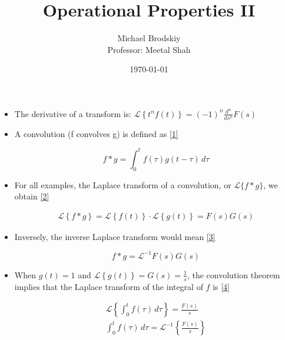 \documentclass[12pt]{article}
\title{Operational Properties II}
\date{\today}
\author{Michael Brodskiy\\ \small Professor: Meetal Shah}
\begin{document}
\maketitle

\begin{itemize}

  \item The derivative of a transform is: $\mathcal{L}\left\{ t^nf(t) \right\}=(-1)^n\frac{d^n}{ds^n}F(s)$

  \item A convolution (f convolves g) is defined as \eqref{1}

    \begin{equation}
      f\ast g=\int_0^t f(\tau)g(t-\tau)\,d\tau
      \label{1}
    \end{equation}

  \item For all examples, the Laplace transform of a convolution, or $\mathcal{L}\{f\ast g\}$, we obtain \eqref{2}

    \begin{equation}
      \begin{split}
        \mathcal{L}\left\{ f\ast g \right\}=\mathcal{L}\left\{ f(t) \right\}\cdot\mathcal{L}\left\{ g(t) \right\}=F(s)G(s)
      \end{split}
      \label{2}
    \end{equation}

  \item Inversely, the inverse Laplace transform would mean \eqref{3}

    \begin{equation}
      f\ast g=\mathcal{L}^{-1}{F(s)G(s)}
      \label{3}
    \end{equation}
  
  \item When $g(t)=1$ and $\mathcal{L}\left\{ g(t) \right\}=G(s)=\frac{1}{s}$, the convolution theorem implies that the Laplace transform of the integral of $f$ is \eqref{4}

    \begin{equation}
      \begin{split}
      \mathcal{L}\left\{ \int_0^t f(\tau)\,d\tau \right\}=\frac{F(s)}{s}\\
      \int_0^t f(\tau)\,d\tau=\mathcal{L}^{-1}\left\{\frac{F(s)}{s}\right\}\\
    \end{split}
      \label{4}
    \end{equation}


\end{itemize}
\end{document}
